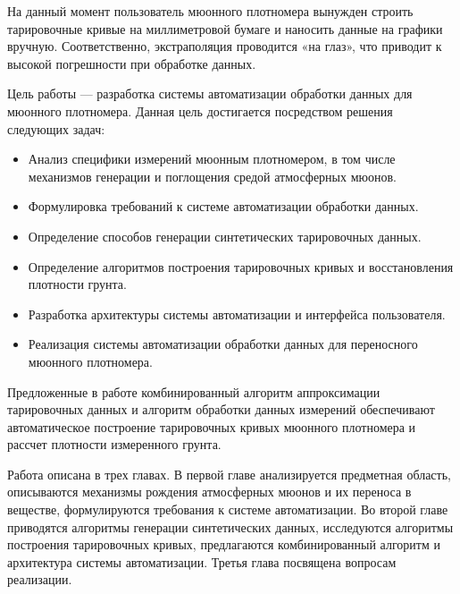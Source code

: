 На данный момент пользователь мюонного плотномера вынужден строить тарировочные кривые на миллиметровой бумаге 
и наносить данные на графики вручную. Соответственно, экстраполяция проводится «на глаз», что приводит к высокой 
погрешности при обработке данных.


Цель работы --- разработка системы автоматизации обработки данных для мюонного плотномера. 
Данная цель достигается посредством решения следующих задач:

\begin{itemize}
 \item Анализ специфики измерений мюонным плотномером, в том числе механизмов генерации и поглощения средой атмосферных мюонов.
 \item Формулировка требований к системе автоматизации обработки данных.
 \item Определение способов генерации синтетических тарировочных данных. 
 \item Определение алгоритмов построения тарировочных кривых и  восстановления плотности грунта.
 \item Разработка архитектуры системы автоматизации и интерфейса пользователя.
 \item Реализация системы автоматизации обработки данных для переносного мюонного плотномера.
\end{itemize}

Предложенные в работе комбинированный алгоритм аппроксимации тарировочных данных и алгоритм обработки данных измерений
обеспечивают автоматическое построение тарировочных кривых мюонного плотномера и рассчет плотности измеренного грунта.

Работа описана в трех главах. В первой главе анализируется предметная область, описываются механизмы рождения атмосферных мюонов и их переноса в веществе,
 формулируются требования к системе автоматизации. Во второй главе приводятся алгоритмы генерации синтетических данных, 
 исследуются  алгоритмы построения тарировочных кривых, предлагаются комбинированный алгоритм и архитектура системы автоматизации.
 Третья глава посвящена вопросам реализации. 

\clearpage